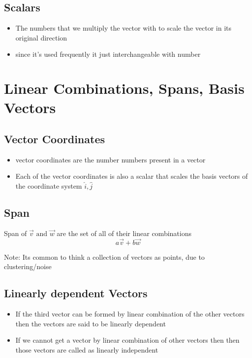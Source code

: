 \documentclass[a4paper]{article}
\begin{document}
\subsection{Scalars}
\begin{itemize}
	\item The numbers that we multiply the vector with to scale the vector
	      in its original direction
	\item since it's used frequently it just interchangeable with number
\end{itemize}


\newpage
\section{Linear Combinations, Spans, Basis Vectors}

\subsection{Vector Coordinates}
\begin{itemize}
	\item vector coordinates are the number numbers present in a vector
	\item Each of the vector coordinates is also a scalar
	      that scales the basis vectors of the coordinate system $\hat{i}, \hat{j}$
\end{itemize}

\subsection{Span}
Span of $\vec{v} \text{ and } \vec{w}$ are the set of all of their linear combinations
\[
	a \vec{v} + b \vec{w}
\]

Note: Its common to think a collection of vectors as points, due to clustering/noise

\subsection{Linearly dependent Vectors}
\begin{itemize}
	\item If the third vector can be formed by linear combination of the other vectors
	      then the vectors are said to be linearly dependent
	\item If we cannot get a vector by linear combination of other vectors then
	      then those vectors are called as linearly independent
\end{itemize}
\end{document}
